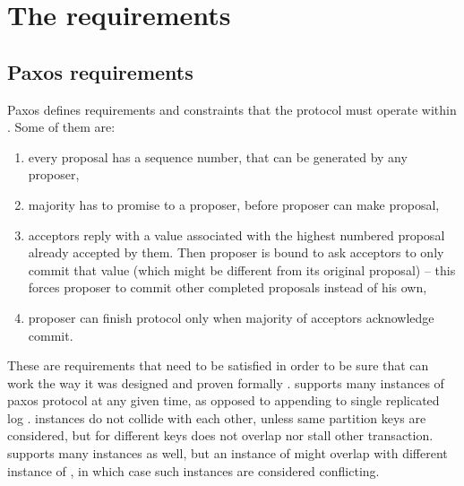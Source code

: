 
\section{The requirements}\label{sec:mpp:requirements}

\subsection{Paxos requirements}
Paxos defines requirements and constraints that the protocol must operate within \cite{lamport2001paxosMadeSimple}. Some of them are: \begin{enumerate}
  \item every proposal has a sequence number, that can be generated by any proposer,
  \item majority has to promise to a proposer, before proposer can make proposal,
  \item acceptors reply with a value associated with the highest numbered proposal already accepted by them. Then proposer is bound to ask acceptors to only commit that value (which might be different from its original proposal) -- this forces proposer to commit other completed proposals instead of his own,\label{sec:mpp:requirements:finishInProgress}
  \item proposer can finish protocol only when majority of acceptors acknowledge commit.
\end{enumerate}
These are requirements that need to be satisfied in order to be sure that \paxos can work the way it was designed and proven formally \cite{Lamport1998partTimeParliment}. 
\lwt supports many instances of paxos protocol at any given time, as opposed to appending to single replicated log \cite{chandra2007PaxosMadeLive}. \lwt instances do not collide with each other, unless same partition keys are considered, but \lwt for different keys does not overlap nor stall other \lwt transaction.
\mpp supports many instances as well, but an instance of \mpp might overlap with different instance of \mpp, in which case such instances are considered conflicting. 


